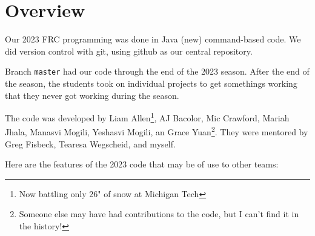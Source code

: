 \documentclass[]{article}
\newcommand{\zztt}[1]{{\texttt{\footnotesize{#1}}}}
\begin{document}
\section{Overview}

Our 2023 FRC programming was done in Java (new) command-based code.
We did version control with git, using github as our central repository.

Branch \zztt{master} had our code through the end of the 2023 season. After the end of the season, the students took on individual projects to get somethings working that they never got working during the season.

\iffalse
In the past, I have listed out the student's names and graduation dates to acknowledge their efforts; because of privacy considerations, I cannot do this in this document.
\else
The code was developed by Liam Allen\footnote{Now battling only 26" of snow at Michigan Tech}, AJ Bacolor, Mic Crawford, Mariah Jhala,  Manasvi Mogili, Yeshasvi Mogili, an Grace Yuan\footnote{Someone else may have had contributions to the code, but I can't find it in the history!}.
They were mentored by Greg Fisbeck, Tearesa Wegscheid, and myself.
\fi

\pagebreak

Here are the features of the 2023 code that may be of use to other teams:
\end{document}
